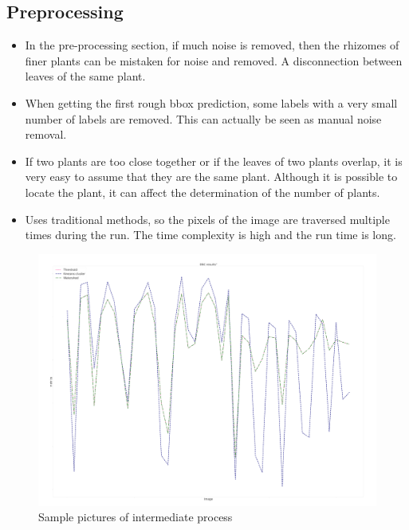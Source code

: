 \documentclass[conference]{IEEEtran}
\begin{document}
\subsection{Preprocessing}
\begin{itemize}
\item In the pre-processing section, if much noise is removed, then the rhizomes of finer plants can be mistaken for noise and removed. A disconnection between leaves of the same plant.
\item When getting the first rough bbox prediction, some labels with a very small number of labels are removed. This can actually be seen as manual noise removal.
\item If two plants are too close together or if the leaves of two plants overlap, it is very easy to assume that they are the same plant. Although it is possible to locate the plant, it can affect the determination of the number of plants.
\item Uses traditional methods, so the pixels of the image are traversed multiple times during the run. The time complexity is high and the run time is long.
\end{itemize}

\begin{figure}[htbp]
\centerline{\includegraphics[scale=0.15]{DSC.png}}
\caption{Sample pictures of intermediate process }
\label{fig8}
\end{figure}
\end{document}
